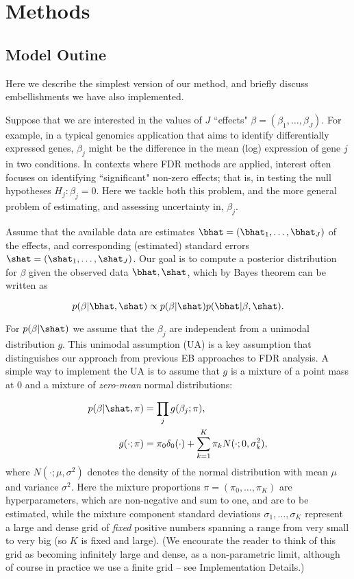 \section*{Methods}

\subsection*{Model Outine}

Here we describe the simplest version of our method, and briefly discuss embellishments we have also implemented.

Suppose that we are interested in the values of $J$ ``effects" $\beta=(\beta_1,\dots,\beta_J)$. For example, in a typical genomics application
that aims to identify differentially expressed genes,  $\beta_j$ might be the difference in the mean (log) expression of gene $j$ in two conditions.
In contexts where FDR methods are applied, interest often focuses on identifying ``significant" non-zero effects;
that is, in testing the null hypotheses $H_j:\beta_j=0$.  Here we tackle both this problem, and the  
more general problem of estimating, and assessing uncertainty in, $\beta_j$.

Assume that the available data are estimates $\bhat=(\bhat_1,\dots,\bhat_J)$ of the effects,
and corresponding (estimated) standard errors $\shat=(\shat_1,\dots,\shat_J)$.  Our goal is to compute a posterior distribution for $\beta$ given the observed data $\bhat,\shat$,
which by Bayes theorem can be written as

\begin{equation}
p(\beta | \bhat, \shat) \propto p(\beta | \shat) p(\bhat | \beta, \shat).
\end{equation}

For $p(\beta | \shat)$ we assume that the $\beta_j$ are independent from a unimodal distribution $g$.
This unimodal assumption (UA) is a key assumption that distinguishes our approach from previous EB approaches to FDR analysis.
A simple way to implement the UA is to assume that $g$ is
a mixture of a point mass at 0 and a mixture of {\it zero-mean} normal distributions:

\begin{align}
\label{eqn:beta}
p(\beta | \shat, \pi) & = \prod_j g(\beta_j; \pi), \\   
g(\cdot; \pi) & = \pi_0 \delta_0(\cdot) + \sum_{k=1}^K \pi_k N(\cdot; 0, \sigma_k^2), \label{eqn:mixnorm}
\end{align}
where $N(\cdot; \mu, \sigma^2)$ denotes the density of the normal distribution with mean $\mu$ and variance $\sigma^2$.
Here the mixture proportions $\pi=(\pi_0,\dots,\pi_K)$ are hyperparameters, which are non-negative and sum to one, and are to be estimated,
while the mixture component standard deviations $\sigma_1,\dots,\sigma_K$ 
represent a large and dense grid of {\it fixed} positive numbers spanning a range from very small to very big (so $K$ is fixed and large). 
(We encourate the reader to think of this grid as becoming infinitely large and dense, as a non-parametric limit,
although of course in practice we use a finite grid -- see Implementation Details.)

